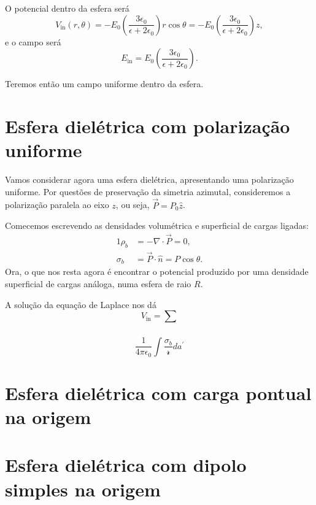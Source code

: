 \documentclass{article}
\begin{document}
O potencial dentro da esfera será
\begin{equation}
 V_{\mathrm{in}}(r,\theta) = - E_0 \left( \frac{3\epsilon_0}{\epsilon + 2\epsilon_0} \right) r\cos{\theta} =
 - E_0 \left( \frac{3\epsilon_0}{\epsilon + 2\epsilon_0} \right) z\mathrm{,}
\end{equation}
e o campo será
\begin{equation}
 E_{\mathrm{in}} = E_0 \left( \frac{3\epsilon_0}{\epsilon + 2\epsilon_0} \right)\mathrm{.}
\end{equation}

Teremos então um campo uniforme dentro da esfera.

\section{Esfera dielétrica com polarização uniforme}
Vamos considerar agora uma esfera dielétrica, apresentando uma polarização uniforme. Por questões de preservação da simetria azimutal, consideremos a polarização
paralela ao eixo $z$, ou seja, $\vec{P} = P_0 \hat{z}$.

Comecemos escrevendo as densidades volumétrica e superficial de cargas ligadas:
\begin{alignat}{1}
 \rho_b &= -\nabla \cdot \vec{P} = 0\mathrm{,}\\
 \sigma_b &= \vec{P}\cdot \hat{n} = P \cos{\theta}\mathrm{.}
\end{alignat}
Ora, o que nos resta agora é encontrar o potencial produzido por uma densidade superficial de cargas análoga, numa esfera de raio $R$.

A solução da equação de Laplace nos dá
\begin{equation}
 V_{\mathrm{in}} = \sum_{}
\end{equation}

\begin{equation}
 \frac{1}{4 \pi \epsilon_0} \int \frac{\sigma_b}{\mathcal{r}} da^{\prime}
\end{equation}


\section{Esfera dielétrica com carga pontual na origem}

\section{Esfera dielétrica com dipolo simples na origem}
\end{document}
